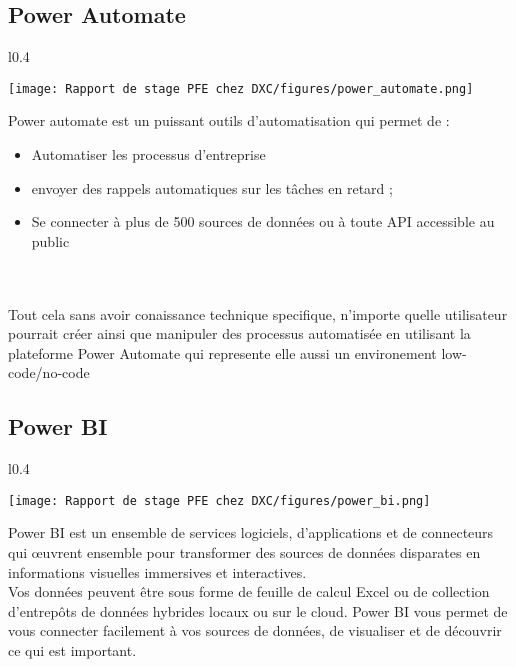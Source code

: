 \subsection{Power Automate }

\begin{wrapfigure}{l}{0.4\textwidth}
  \begin{center}
    \texttt{[image: Rapport de stage PFE chez DXC/figures/power\_automate.png]}
  \end{center}
\end{wrapfigure}

Power automate est un puissant outils d'automatisation qui permet de :
\begin{itemize}
  \item Automatiser les processus d’entreprise
  \item envoyer des rappels automatiques sur les tâches en retard ;
  \item Se connecter à plus de 500 sources de données ou à toute API accessible au public
\end{itemize}
\\ 
\\
Tout cela sans avoir conaissance technique specifique, n'importe quelle utilisateur pourrait créer ainsi que manipuler des processus automatisée en utilisant la plateforme Power Automate qui represente elle aussi un environement low-code/no-code

\subsection{Power BI }

\begin{wrapfigure}{l}{0.4\textwidth}
  \begin{center}
    \texttt{[image: Rapport de stage PFE chez DXC/figures/power\_bi.png]}
  \end{center}
\end{wrapfigure}

Power BI est un ensemble de services logiciels, d’applications et de connecteurs qui œuvrent ensemble pour transformer des sources de données disparates en informations visuelles immersives et interactives. 
\\
Vos données peuvent être sous forme de feuille de calcul Excel ou de collection d’entrepôts de données hybrides locaux ou sur le cloud. Power BI vous permet de vous connecter facilement à vos sources de données, de visualiser et de découvrir ce qui est important.

